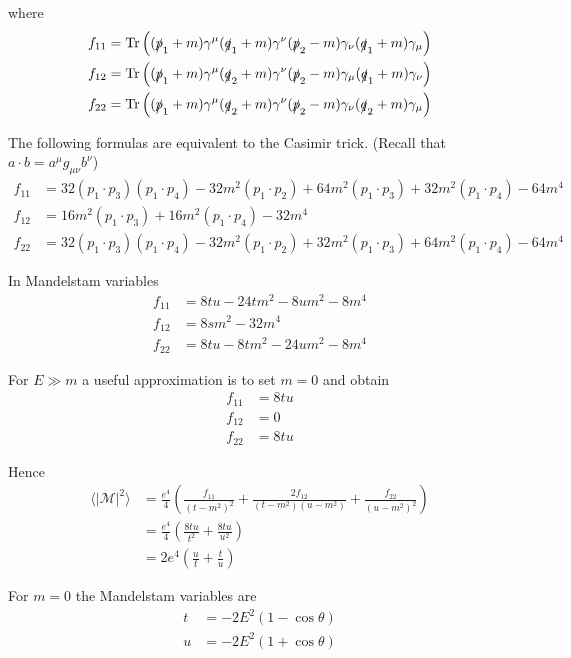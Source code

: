 where
\begin{align*}
f_{11}&=\operatorname{Tr}
\left(
(\slashed p_1+m)\gamma^\mu(\slashed q_1+m)\gamma^\nu(\slashed p_2-m)\gamma_\nu(\slashed q_1+m)\gamma_\mu
\right)
\\
f_{12}&=\operatorname{Tr}
\left(
(\slashed p_1+m)\gamma^\mu(\slashed q_2+m)\gamma^\nu(\slashed p_2-m)\gamma_\mu(\slashed q_1+m)\gamma_\nu
\right)
\\
f_{22}&=\operatorname{Tr}
\left(
(\slashed p_1+m)\gamma^\mu(\slashed q_2+m)\gamma^\nu(\slashed p_2-m)\gamma_\nu(\slashed q_2+m)\gamma_\mu
\right)
\end{align*}

The following formulas are equivalent to the Casimir trick.
(Recall that $a\cdot b=a^\mu g_{\mu\nu}b^\nu$)
\begin{align*}
f_{11}&=
 32 (p_1 \cdot p_3) (p_1 \cdot p_4) -
 32 m^2 (p_1 \cdot p_2) +
 64 m^2 (p_1 \cdot p_3) +
 32 m^2 (p_1 \cdot p_4) - 64 m^4
\\
f_{12}&=
 16 m^2 (p_1 \cdot p_3) +
 16 m^2 (p_1 \cdot p_4) - 32 m^4
\\
f_{22}&=
 32 (p_1 \cdot p_3) (p_1 \cdot p_4) -
 32 m^2 (p_1 \cdot p_2) +
 32 m^2 (p_1 \cdot p_3) +
 64 m^2 (p_1 \cdot p_4) - 64 m^4
\end{align*}

In Mandelstam variables
\begin{align*}
f_{11}&=8 t u - 24 t m^2 - 8 u m^2 - 8 m^4
\\
f_{12}&=8 s m^2 - 32 m^4
\\
f_{22}&=8 t u - 8 t m^2 - 24 u m^2 - 8 m^4
\end{align*}

For $E\gg m$ a useful approximation is to set $m=0$ and obtain
\begin{align*}
f_{11}&=8tu
\\
f_{12}&=0
\\
f_{22}&=8tu
\end{align*}

Hence
\begin{align*}
\langle|\mathcal{M}|^2\rangle
&=\frac{e^4}{4}
\left(
\frac{f_{11}}{(t-m^2)^2}
+\frac{2f_{12}}{(t-m^2)(u-m^2)}
+\frac{f_{22}}{(u-m^2)^2}
\right)
\\
&=\frac{e^4}{4}
\left(
\frac{8tu}{t^2}
+\frac{8tu}{u^2}
\right)
\\
&=2e^4
\left(
\frac{u}{t}
+\frac{t}{u}
\right)
\end{align*}

For $m=0$ the Mandelstam variables are
\begin{align*}
t&=-2E^2(1-\cos\theta)
\\
u&=-2E^2(1+\cos\theta)
\end{align*}

